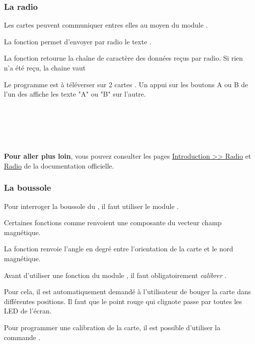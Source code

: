 \subsubsection{La radio}

Les cartes \mb peuvent communiquer entres elles au moyen du module .

La fonction  permet d'envoyer par radio le texte .

La fonction  retourne la chaîne de caractère des données reçus par radio. Si rien n'a été reçu, la chaine vaut 

\begin{methode}
Le programme est à téléverser sur 2 cartes \mb. Un appui sur les boutons A ou B de l'un des \mb affiche les texte "A" ou "B" sur l'autre.

\\
\\
\\
\\
\end{methode}

\begin{remarque}
\textbf{Pour aller plus loin}, vous pouvez consulter les pages  \href{https://microbit-micropython.readthedocs.io/fr/latest/tutorials/radio.html}{Introduction >> Radio} et \href{https://microbit-micropython.readthedocs.io/fr/latest/radio.html}{Radio} de la documentation officielle.
\end{remarque}


\subsubsection{La boussole}

Pour interroger la boussole du \mb, il faut utiliser le module .\par 
Certaines fonctions comme  renvoient une composante du vecteur champ magnétique.\par 
La fonction renvoie l'angle en degré entre l'orientation de la carte \mb et le nord magnétique.

\begin{remarque}
    Avant d'utiliser une fonction du module , il faut obligatoirement \emph{calibrer} \mb.
    
    Pour cela, il est automatiquement demandé à l'utilisateur de bouger la carte dans différentes positions. Il faut que le point rouge qui clignote passe par toutes les LED de l'écran.
    
    Pour programmer une calibration de la carte, il est possible d'utiliser la commande .
\end{remarque}


